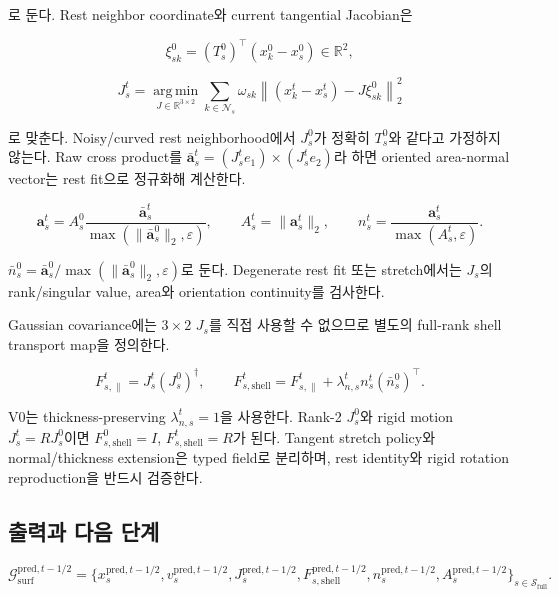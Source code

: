 \documentclass[11pt,a4paper]{article}
\newcommand{\R}{\mathbb{R}}
\newcommand{\eps}{\varepsilon}
\newcommand{\argmin}{\operatorname*{arg\,min}}
\begin{document}
로 둔다. Rest neighbor coordinate와 current tangential Jacobian은

\begin{equation}
  \xi_{sk}^0=(T_s^0)^\top(x_k^0-x_s^0)\in\R^2,
\end{equation}

\begin{equation}
  J_s^t
  =
  \argmin_{J\in\R^{3\times2}}
  \sum_{k\in\mathcal N_s}\omega_{sk}
  \left\|(x_k^t-x_s^t)-J\xi_{sk}^0\right\|_2^2
  \label{eq:tangent-jacobian}
\end{equation}

로 맞춘다. Noisy/curved rest neighborhood에서 \(J_s^0\)가 정확히 \(T_s^0\)와 같다고
가정하지 않는다. Raw cross product를
\(\bar{\mathbf a}_s^t=(J_s^te_1)\times(J_s^te_2)\)라 하면
oriented area-normal vector는 rest fit으로 정규화해 계산한다.

\begin{equation}
  \mathbf a_s^t
  =
  A_s^0
  \frac{\bar{\mathbf a}_s^t}
  {\max(\|\bar{\mathbf a}_s^0\|_2,\eps)},
  \qquad
  A_s^t=\|\mathbf a_s^t\|_2,
  \qquad
  n_s^t=\frac{\mathbf a_s^t}{\max(A_s^t,\eps)}.
  \label{eq:area-normal}
\end{equation}

\(\bar n_s^0=\bar{\mathbf a}_s^0/\max(\|\bar{\mathbf a}_s^0\|_2,\eps)\)로 둔다.
Degenerate rest fit 또는 stretch에서는 \(J_s\)의 rank/singular value, area와 orientation continuity를 검사한다.

Gaussian covariance에는 \(3\times2\) \(J_s\)를 직접 사용할 수 없으므로
별도의 full-rank shell transport map을 정의한다.

\begin{equation}
  F_{s,\parallel}^t=J_s^t(J_s^0)^\dagger,
  \qquad
  F_{s,\mathrm{shell}}^t
  =
  F_{s,\parallel}^t
  +\lambda_{n,s}^t n_s^t(\bar n_s^0)^\top.
  \label{eq:full-shell-map}
\end{equation}

V0는 thickness-preserving \(\lambda_{n,s}^t=1\)을 사용한다.
Rank-2 \(J_s^0\)와 rigid motion \(J_s^t=RJ_s^0\)이면
\(F_{s,\mathrm{shell}}^0=I\), \(F_{s,\mathrm{shell}}^t=R\)가 된다.
Tangent stretch policy와 normal/thickness extension은 typed field로 분리하며,
rest identity와 rigid rotation reproduction을 반드시 검증한다.

\subsection*{출력과 다음 단계}

\begin{equation}
  \mathcal G_{\mathrm{surf}}^{\mathrm{pred},t-1/2}
  =
  \{x_s^{\mathrm{pred},t-1/2},v_s^{\mathrm{pred},t-1/2},
  J_s^{\mathrm{pred},t-1/2},F_{s,\mathrm{shell}}^{\mathrm{pred},t-1/2},
  n_s^{\mathrm{pred},t-1/2},A_s^{\mathrm{pred},t-1/2}\}_{s\in\mathcal S_{\mathrm{full}}}.
\end{equation}
\end{document}
